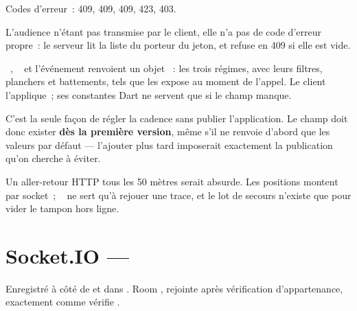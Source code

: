 Codes d'erreur~:  409,  409,
 409,  423,
 403.

L'audience n'étant pas transmise par le client, elle n'a pas de code d'erreur propre~: le
serveur lit la liste  du porteur du jeton, et refuse en 409
 si elle est vide.

\begin{note}
\mPOST{}~, \mGET{}~ et l'événement
 renvoient un objet ~: les trois régimes, avec leurs filtres,
planchers et battements, tels que  les expose au moment de l'appel. Le
client l'applique~; ses constantes Dart ne servent que si le champ manque.

C'est la seule façon de régler la cadence sans publier l'application. Le champ doit donc
exister \textbf{dès la première version}, même s'il ne renvoie d'abord que les valeurs par
défaut --- l'ajouter plus tard imposerait exactement la publication qu'on cherche à éviter.
\end{note}

\begin{note}
Un aller-retour HTTP tous les 50 mètres serait absurde. Les positions montent par socket~;
\mGET{}~ ne sert qu'à rejouer une trace, et le lot de secours
n'existe que pour vider le tampon hors ligne.
\end{note}

\section{Socket.IO --- }

Enregistré à côté de  et  dans . Room
, rejointe après vérification d'appartenance, exactement comme
 vérifie .

